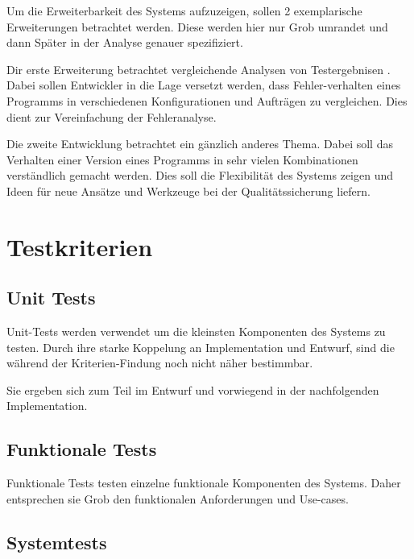 Um die Erweiterbarkeit des Systems aufzuzeigen,
sollen 2 exemplarische Erweiterungen betrachtet werden.
Diese werden hier nur Grob umrandet und dann Sp\"ater in der Analyse genauer spezifiziert.

Dir erste Erweiterung betrachtet vergleichende Analysen von Testergebnisen .
Dabei sollen Entwickler in die Lage versetzt werden,
dass Fehler-verhalten eines Programms in verschiedenen Konfigurationen und Auftr\"agen zu vergleichen.
Dies dient zur Vereinfachung der Fehleranalyse.

Die zweite Entwicklung betrachtet ein gänzlich anderes Thema.
Dabei soll das Verhalten einer Version eines Programms
in sehr vielen Kombinationen verst\"andlich gemacht werden.
Dies soll die Flexibilit\"at des Systems zeigen und
Ideen f\"ur neue Ans\"atze und Werkzeuge bei der Qualit\"atssicherung liefern.





\section{Testkriterien}


\subsection{Unit Tests}

Unit-Tests werden verwendet um die kleinsten Komponenten des Systems zu testen.
Durch ihre starke Koppelung an Implementation und Entwurf,
sind die w\"ahrend der Kriterien-Findung noch nicht n\"aher bestimmbar.

Sie ergeben sich zum Teil im Entwurf und vorwiegend in
der nachfolgenden Implementation.

\subsection{Funktionale Tests}

Funktionale Tests testen einzelne funktionale Komponenten des Systems.
Daher entsprechen sie Grob den funktionalen Anforderungen und Use-cases.

\subsection{Systemtests}

